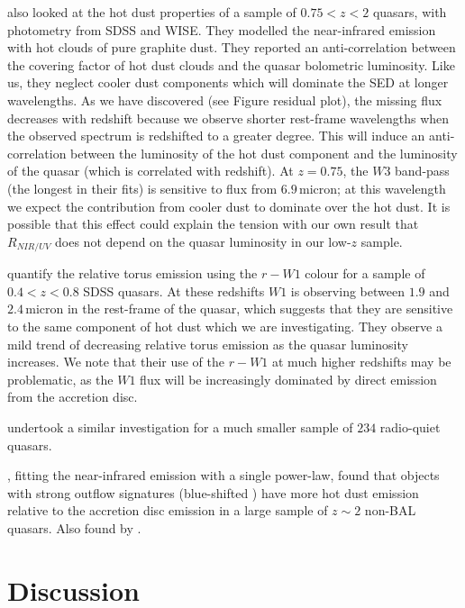 \citet{mor11} also looked at the hot dust properties of a sample of $0.75 < z < 2$ quasars, with photometry from SDSS and WISE. 
They modelled the near-infrared emission with hot clouds of pure graphite dust. 
They reported an anti-correlation between the covering factor of hot dust clouds and the quasar bolometric luminosity. 
Like us, they neglect cooler dust components which will dominate the SED at longer wavelengths. 
As we have discovered (see Figure residual plot), the missing flux decreases with redshift because we observe shorter rest-frame wavelengths when the observed spectrum is redshifted to a greater degree. 
This will induce an anti-correlation between the luminosity of the hot dust component and the luminosity of the quasar (which is correlated with redshift). 
At $z=0.75$, the $W3$ band-pass (the longest in their fits) is sensitive to flux from $6.9$\,micron; at this wavelength we expect the contribution from cooler dust to dominate over the hot dust. 
It is possible that this effect could explain the tension with our own result that $R_{NIR/UV}$ does not depend on the quasar luminosity in our low-$z$ sample. 

\citet{shen14} quantify the relative torus emission using the $r-W1$ colour for a sample of $0.4 < z < 0.8$ SDSS quasars. 
At these redshifts $W1$ is observing between $1.9$ and $2.4$\,micron in the rest-frame of the quasar, which suggests that they are sensitive to the same component of hot dust which we are investigating. 
They observe a mild trend of decreasing relative torus emission as the quasar luminosity increases. 
We note that their use of the $r-W1$ at much higher redshifts may be problematic, as the $W1$ flux will be increasingly dominated by direct emission from the accretion disc. 

\citet{gallagher07} undertook a similar investigation for a much smaller sample of $234$ radio-quiet quasars.

 
\citet{wang13}, fitting the near-infrared emission with a single power-law, found that objects with strong outflow signatures (blue-shifted ) have more hot dust emission relative to the accretion disc emission in a large sample of $z\sim2$ non-BAL quasars. 
Also found by \citet{shen14}. 



\section{Discussion}

